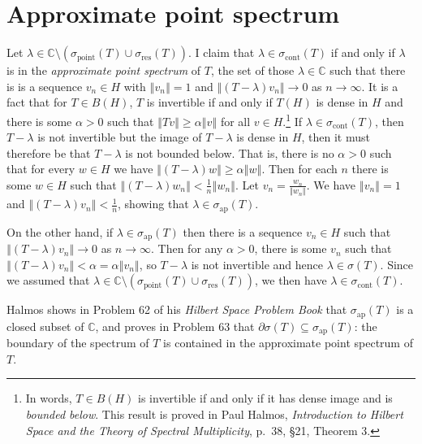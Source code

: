 \documentclass{article}
\newcommand{\point}{\sigma_{\textrm{point}}}
\newcommand{\ap}{\sigma_{\textrm{ap}}}
\newcommand{\cont}{\sigma_{\textrm{cont}}}
\newcommand{\residual}{\sigma_{\textrm{res}}}
\newcommand{\norm}[1]{\left\Vert #1 \right\Vert}
\begin{document}
\section{Approximate point spectrum}
Let $\lambda \in \mathbb{C} \setminus (\point(T) \cup \residual(T))$. I claim that $\lambda \in \cont(T)$  if and only if $\lambda$ is in the {\em approximate
point spectrum} of $T$, the set of those $\lambda \in \mathbb{C}$ such that there is
is a sequence
$v_n \in H$ with  $\norm{v_n}=1$ and $\norm{(T-\lambda)v_n} \to 0$ as $n \to \infty$.
It is a fact that for $T \in B(H)$,
$T$ is invertible if and only if $T(H)$ is dense in $H$ and there is some $\alpha>0$ such that $\norm{Tv} \geq \alpha \norm{v}$ for all $v \in H$.\footnote{In words,
$T \in B(H)$ is invertible if and only if it has dense image and is {\em bounded below}. This result is proved
in Paul Halmos, {\em Introduction to Hilbert Space and the Theory
of Spectral Multiplicity}, p.~38, \S 21, Theorem 3.} If $\lambda 
\in \cont(T)$, then $T-\lambda$ is not invertible but the image of $T-\lambda$ is dense in $H$, then it must therefore be that
$T-\lambda$ is not bounded below. That is, there is no $\alpha>0$ such that for every $w \in H$ we have $\norm{(T-\lambda)w} \geq \alpha \norm{w}$.
Then for each $n$ there is some $w \in H$ such that $\norm{(T-\lambda)w_n} < \frac{1}{n} \norm{w_n}$. Let $v_n=\frac{w_n}{\norm{w_n}}$. We  have
$\norm{v_n}=1$ and $\norm{(T-\lambda)v_n}<\frac{1}{n}$, showing that $\lambda \in \ap(T)$.

On the other hand, if $\lambda \in \ap(T)$ then  there is a sequence $v_n \in H$ such that $\norm{(T-\lambda)v_n} \to 0$ as $n \to \infty$. Then for any $\alpha>0$, there is some $v_n$ such that
$\norm{(T-\lambda)v_n}<\alpha=\alpha \norm{v_n}$, so $T-\lambda$ is not invertible and hence $\lambda \in \sigma(T)$. Since we assumed that
$\lambda \in \mathbb{C} \setminus (\point(T) \cup \residual(T))$, we then have $\lambda \in \cont(T)$.

Halmos shows in Problem 62 of his {\em Hilbert Space Problem Book} that
$\ap(T)$ is a closed subset of $\mathbb{C}$, and proves in Problem 63 that $\partial \sigma(T) \subseteq \ap(T)$: the boundary of the spectrum of $T$
is contained in the approximate point spectrum of $T$.
\end{document}
